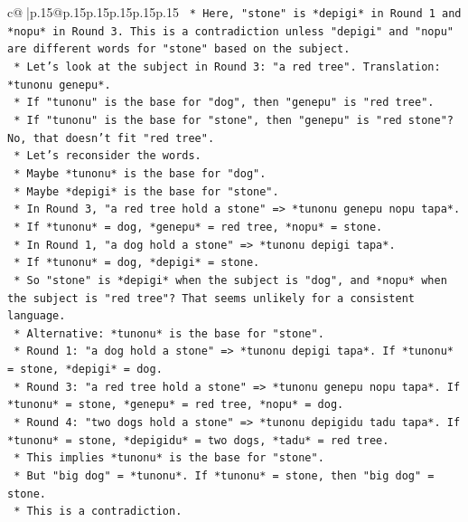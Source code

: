 \documentclass{article}
\begin{document}
{\begin{supertabular}{c@{$\;$}|p{.15\linewidth}@{}p{.15\linewidth}p{.15\linewidth}p{.15\linewidth}p{.15\linewidth}p{.15\linewidth}}
{{{\texttt{        *   Here, "stone" is *depigi* in Round 1 and *nopu* in Round 3. This is a contradiction unless "depigi" and "nopu" are different words for "stone" based on the subject.} \\
\texttt{        *   Let's look at the subject in Round 3: "a red tree". Translation: *tunonu genepu*.} \\
\texttt{        *   If "tunonu" is the base for "dog", then "genepu" is "red tree".} \\
\texttt{        *   If "tunonu" is the base for "stone", then "genepu" is "red stone"? No, that doesn't fit "red tree".} \\
\texttt{        *   Let's reconsider the words.} \\
\texttt{        *   Maybe *tunonu* is the base for "dog".} \\
\texttt{        *   Maybe *depigi* is the base for "stone".} \\
\texttt{        *   In Round 3, "a red tree hold a stone" => *tunonu genepu nopu tapa*.} \\
\texttt{        *   If *tunonu* = dog, *genepu* = red tree, *nopu* = stone.} \\
\texttt{        *   In Round 1, "a dog hold a stone" => *tunonu depigi tapa*.} \\
\texttt{        *   If *tunonu* = dog, *depigi* = stone.} \\
\texttt{        *   So "stone" is *depigi* when the subject is "dog", and *nopu* when the subject is "red tree"? That seems unlikely for a consistent language.} \\
\texttt{        *   Alternative: *tunonu* is the base for "stone".} \\
\texttt{        *   Round 1: "a dog hold a stone" => *tunonu depigi tapa*. If *tunonu* = stone, *depigi* = dog.} \\
\texttt{        *   Round 3: "a red tree hold a stone" => *tunonu genepu nopu tapa*. If *tunonu* = stone, *genepu* = red tree, *nopu* = dog.} \\
\texttt{        *   Round 4: "two dogs hold a stone" => *tunonu depigidu tadu tapa*. If *tunonu* = stone, *depigidu* = two dogs, *tadu* = red tree.} \\
\texttt{        *   This implies *tunonu* is the base for "stone".} \\
\texttt{        *   But "big dog" = *tunonu*. If *tunonu* = stone, then "big dog" = stone.} \\
\texttt{        *   This is a contradiction.} \\
}}}
\end{supertabular}}
\end{document}
